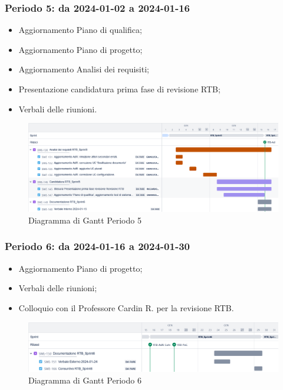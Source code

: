 \documentclass[10pt, a4paper]{article}
\begin{document}
\subsubsection{Periodo 5: da 2024-01-02 a 2024-01-16}
\begin{itemize}
    \item Aggiornamento Piano di qualifica;
    \item Aggiornamento Piano di progetto;
    \item Aggiornamento Analisi dei requisiti;
    \item Presentazione candidatura prima fase di revisione RTB;
    \item Verbali delle riunioni.
\end{itemize}
\begin{figure}[H]
    \centering        
    \includegraphics[width=15.5cm]{gantt/ganttPeriodo5.png}
    \caption{Diagramma di Gantt Periodo 5}
\end{figure}

\subsubsection{Periodo 6: da 2024-01-16 a 2024-01-30}
%
\begin{itemize}
    \item Aggiornamento Piano di progetto;
    \item Verbali delle riunioni;
    \item Colloquio con il Professore Cardin R. per la revisione RTB.
\end{itemize}
\begin{figure}[H]
    \centering        
    \includegraphics[width=15.5cm]{gantt/ganttPeriodo6.png}
    \caption{Diagramma di Gantt Periodo 6}
\end{figure}
\end{document}
